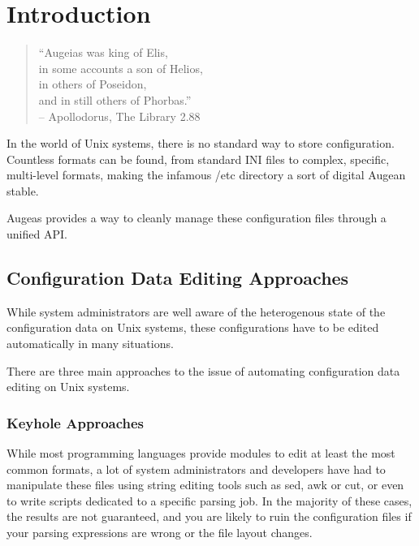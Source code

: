 \cleardoublepage
{}
{}
\chapter*{Introduction}

\begin{verse}
  \begin{flushright}
    \begin{scriptsize}
``Augeias was king of Elis, \\
in some accounts a son of Helios, \\
in others of Poseidon, \\
and in still others of Phorbas.'' \\
\bigskip
\tiny{-- Apollodorus, The Library 2.88}
    \end{scriptsize}
  \end{flushright}
\end{verse}

\bigskip

In the world of Unix systems, there is no standard way to store configuration. Countless formats can be found, from standard INI files to complex, specific, multi-level formats, making the infamous /etc directory a sort of digital Augean stable.

Augeas provides a way to cleanly manage these configuration files through a unified API.

\section{Configuration Data Editing Approaches}

While system administrators are well aware of the heterogenous state of the configuration data on Unix systems, these configurations have to be edited automatically in many situations.

There are three main approaches to the issue of automating configuration data editing on Unix systems.

\subsection{Keyhole Approaches}

While most programming languages provide modules to edit at least the most common formats, a lot of system administrators and developers have had to manipulate these files using string editing tools such as sed, awk or cut, or even to write scripts dedicated to a specific parsing job. In the majority of these cases, the results are not guaranteed, and you are likely to ruin the configuration files if your parsing expressions are wrong or the file layout changes.

